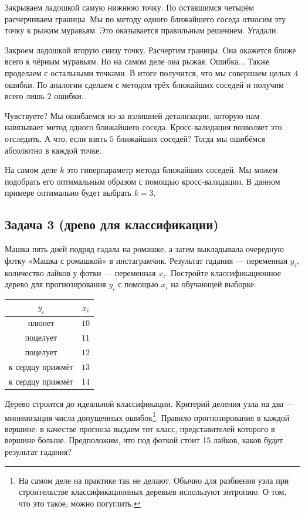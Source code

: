 \documentclass[12pt, a4paper, oneside]{article}
\begin{document}
{\begin{enumerate}
		Закрываем ладошкой самую нижнюю точку. По оставшимся четырём расчерчиваем границы. Мы по методу одного ближайшего соседа относим эту точку к рыжим муравьям. Это оказывается правильным решением. Угадали.
		
		Закроем ладошкой вторую снизу точку. Расчертим границы. Она окажется ближе всего к чёрным муравьям. Но на самом деле она рыжая. Ошибка... Также проделаем с остальными точками. В итоге получится, что мы совершаем целых $4$ ошибки. По аналогии сделаем с методом трёх ближайших соседей и получим всего лишь $2$ ошибки. 
		
		Чувствуете? Мы ошибаемся из-за излишней детализации, которую нам навязывает метод одного ближайшего соседа. Кросс-валидация позволяет это отследить. А что, если взять $5$ ближайших соседей? Тогда мы ошибёмся абсолютно в каждой точке.
		
		На самом деле $k$ это гиперпараметр метода ближайших соседей. Мы можем подобрать его оптимальным образом с помощью кросс-валидации. В данном примере оптимально будет выбрать $k=3$.  
	\end{enumerate}
}



\subsection*{Задача 3 (древо для классификации)}

Машка пять дней подряд гадала на ромашке, а затем выкладывала очередную фотку «Машка с ромашкой» в инстаграмчик. Результат гадания — переменная $y_i$, количество лайков у фотки — переменная $x_i$. Постройте классификационное дерево для прогнозирования $y_i$ с помощью $x_i$ на обучающей выборке:

\begin{center}
	\begin{tabular}{cc}
		$y_i$ & $x_i$ \\
		\hline
		плюнет & $10$ \\
		поцелует & $11$ \\
		поцелует & $12$ \\
		к сердцу прижмёт & $13$ \\
		к сердцу прижмёт & $14$ \\
	\end{tabular}
\end{center}

Дерево строится до идеальной классификации. Критерий деления узла на два — минимизация числа допущенных ошибок\footnote{На самом деле на практике так не делают. Обычно для разбиения узла при строительстве классификационных деревьев используют энтропию. О том, что это такое, можно погуглить.}.  Правило прогнозирования в каждой вершине: в качестве прогноза выдаем тот класс, представителей которого в вершине больше.  Предположим, что под фоткой стоит 15 лайков, каков будет результат гадания? 
\end{document}
